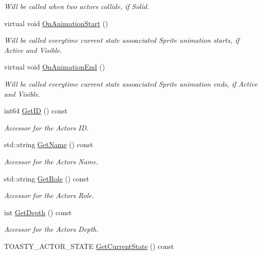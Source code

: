 \begin{DoxyCompactItemize}
\begin{DoxyCompactList}\small\item\em Will be called when two actors collide, if Solid. \end{DoxyCompactList}\item 
virtual void \hyperlink{class_i_ty_actor_ace0a008487e45e3f5fd6ac6301ef6acb}{OnAnimationStart} ()
\begin{DoxyCompactList}\small\item\em Will be called everytime current state assoaciated Sprite animation starts, if Active and Visible. \end{DoxyCompactList}\item 
virtual void \hyperlink{class_i_ty_actor_aa1eda801c41618d6025249e0dbc3cc49}{OnAnimationEnd} ()
\begin{DoxyCompactList}\small\item\em Will be called everytime current state assoaciated Sprite animation ends, if Active and Visible. \end{DoxyCompactList}\item 
int64 \hyperlink{class_i_ty_actor_a56e1581ea21a61d56ee13065b1bb237d}{GetID} () const 
\begin{DoxyCompactList}\small\item\em Accessor for the Actors ID. \end{DoxyCompactList}\item 
std::string \hyperlink{class_i_ty_actor_ad96e4d0568d002ec80b3f3511d34bac4}{GetName} () const 
\begin{DoxyCompactList}\small\item\em Accessor for the Actors Name. \end{DoxyCompactList}\item 
std::string \hyperlink{class_i_ty_actor_acb6782b902f1d23196ee5d4459a7f4c6}{GetRole} () const 
\begin{DoxyCompactList}\small\item\em Accessor for the Actors Role. \end{DoxyCompactList}\item 
int \hyperlink{class_i_ty_actor_a3a317a12d0872943894aef2ab1395c7c}{GetDepth} () const 
\begin{DoxyCompactList}\small\item\em Accessor for the Actors Depth. \end{DoxyCompactList}\item 
TOASTY\_\-ACTOR\_\-STATE \hyperlink{class_i_ty_actor_adc9729b29f07da02bbfa26d423901b45}{GetCurrentState} () const 

\end{DoxyCompactItemize}
